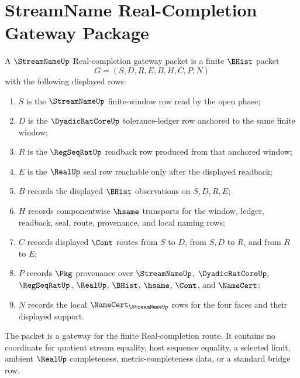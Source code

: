 \section{StreamName Real-Completion Gateway Package}
\label{sec:streamname-real-completion-gateway-package}

\begin{definition}
\label{def:streamname-real-completion-gateway-carrier}
A $\StreamNameUp$ Real-completion gateway packet is a finite $\BHist$ packet
$$
G=(S,D,R,E,B,H,C,P,N)
$$
with the following displayed rows:
\begin{enumerate}
\item $S$ is the $\StreamNameUp$ finite-window row read by the open phase;
\item $D$ is the $\DyadicRatCoreUp$ tolerance-ledger row anchored to the same finite window;
\item $R$ is the $\RegSeqRatUp$ readback row produced from that anchored window;
\item $E$ is the $\RealUp$ seal row reachable only after the displayed readback;
\item $B$ records the displayed $\BHist$ observations on $S,D,R,E$;
\item $H$ records componentwise $\hsame$ transports for the window, ledger, readback, seal, route, provenance, and local naming rows;
\item $C$ records displayed $\Cont$ routes from $S$ to $D$, from $S,D$ to $R$, and from $R$ to $E$;
\item $P$ records $\Pkg$ provenance over $\StreamNameUp$, $\DyadicRatCoreUp$, $\RegSeqRatUp$, $\RealUp$, $\BHist$, $\hsame$, $\Cont$, and $\NameCert$;
\item $N$ records the local $\NameCert_{\StreamNameUp}$ rows for the four faces and their displayed support.
\end{enumerate}
The packet is a gateway for the finite Real-completion route. It contains no coordinate for quotient stream equality, host sequence equality, a selected limit, ambient $\RealUp$ completeness, metric-completeness data, or a standard bridge row.
\end{definition}

